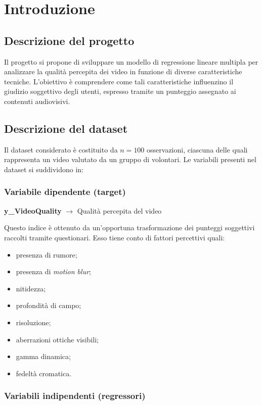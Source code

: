 \section{Introduzione}

\subsection{Descrizione del progetto}
Il progetto si propone di sviluppare un modello di regressione lineare multipla per analizzare la qualità percepita dei video in funzione di diverse caratteristiche tecniche.  
L'obiettivo è comprendere come tali caratteristiche influenzino il giudizio soggettivo degli utenti, espresso tramite un punteggio assegnato ai contenuti audiovisivi.

\subsection{Descrizione del dataset}
Il dataset considerato è costituito da $n = 100$ osservazioni, ciascuna delle quali rappresenta un video valutato da un gruppo di volontari. Le variabili presenti nel dataset si suddividono in:

\subsubsection*{Variabile dipendente (target)}
\textbf{y\_VideoQuality} \quad $\rightarrow$ \quad Qualità percepita del video

\noindent Questo indice è ottenuto da un'opportuna trasformazione dei punteggi soggettivi raccolti tramite questionari. Esso tiene conto di fattori percettivi quali:

\begin{itemize}
    \item presenza di rumore;
    \item presenza di \textit{motion blur};
    \item nitidezza;
    \item profondità di campo;
    \item risoluzione;
    \item aberrazioni ottiche visibili;
    \item gamma dinamica;
    \item fedeltà cromatica.
\end{itemize}

\subsubsection*{Variabili indipendenti (regressori)}

